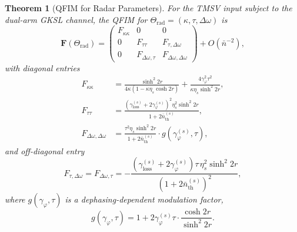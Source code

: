 \documentclass[journal]{IEEEtran}
\newtheorem{theorem}{Theorem}
\begin{document}
\begin{theorem}[QFIM for Radar Parameters]\label{thm:qfim_radar}
For the TMSV input subject to the dual-arm GKSL channel, the QFIM for $\Theta_{\text{rad}} = (\kappa, \tau, \Delta\omega)$ is
\begin{equation}\label{eq:qfim_radar}
\mathbf{F}(\Theta_{\text{rad}}) = \begin{pmatrix}
F_{\kappa\kappa} & 0 & 0 \\
0 & F_{\tau\tau} & F_{\tau,\Delta\omega} \\
0 & F_{\Delta\omega,\tau} & F_{\Delta\omega,\Delta\omega}
\end{pmatrix} + O(\bar{n}^{-2}),
\end{equation}
with diagonal entries
\begin{align}
F_{\kappa\kappa} &= \frac{\sinh^2 2r}{4\kappa(1-\kappa\eta_s\cosh 2r)} + \frac{4\gamma_\varphi^2 \tau^2}{\kappa\eta_s\sinh^2 2r}, \label{eq:f_kappa}\\
F_{\tau\tau} &= \frac{(\gamma_{\text{loss}}^{(s)} + 2\gamma_\varphi^{(s)})^2 \eta_s^2 \sinh^2 2r}{1 + 2\bar{n}_{\text{th}}^{(s)}}, \label{eq:f_tau}\\
F_{\Delta\omega,\Delta\omega} &= \frac{\tau^2 \eta_s \sinh^2 2r}{1 + 2\bar{n}_{\text{th}}^{(s)}} \cdot g(\gamma_\varphi^{(s)}, \tau), \label{eq:f_doppler}
\end{align}
and off-diagonal entry
\begin{equation}\label{eq:f_cross}
F_{\tau,\Delta\omega} = F_{\Delta\omega,\tau} = -\frac{(\gamma_{\text{loss}}^{(s)} + 2\gamma_\varphi^{(s)})\tau\,\eta_s^2 \sinh^2 2r}{(1 + 2\bar{n}_{\text{th}}^{(s)})^2},
\end{equation}
where $g(\gamma_\varphi, \tau)$ is a dephasing-dependent modulation factor,
\begin{equation}\label{eq:g_modulation}
g(\gamma_\varphi, \tau) = 1 + 2\gamma_\varphi^{(s)}\tau \cdot \frac{\cosh 2r}{\sinh^2 2r}.
\end{equation}
\end{theorem}
\end{document}
